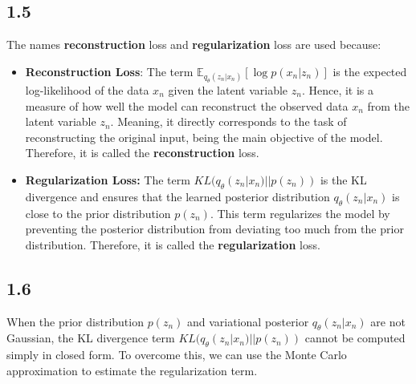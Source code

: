 \documentclass{article}
\begin{document}
\subsection*{1.5}

The names \textbf{reconstruction} loss and \textbf{regularization} loss are used because: 

\begin{itemize}
  \item \textbf{Reconstruction Loss}: The term $\mathbb{E}_{q_{\theta}(z_n|x_n)}[\log p(x_n|z_n)]$ is the expected log-likelihood
  of the data $x_n$ given the latent variable $z_n$. Hence, it is a measure of how well the model can reconstruct the
  observed data $x_n$ from the latent variable $z_n$. Meaning, it directly corresponds to the task of reconstructing the
  original input, being the main objective of the model. Therefore, it is called the \textbf{reconstruction} loss.

  \item\textbf{Regularization Loss:} The term $KL(q_{\theta}(z_n|x_n) || p(z_n))$ is the KL divergence and ensures
that the learned posterior distribution $q_{\theta}(z_n|x_n)$ is close to the prior distribution $p(z_n)$. This term
regularizes the model by preventing the posterior distribution from deviating too much from the prior distribution.
Therefore, it is called the \textbf{regularization} loss.
\end{itemize}

\newpage

\subsection*{1.6}

When the prior distribution $p(z_n)$ and variational posterior $q_{\theta}(z_n|x_n)$ are not Gaussian, the KL divergence
term $KL(q_{\theta}(z_n|x_n) || p(z_n))$ cannot be computed simply in closed form. To overcome this, we can use the
Monte Carlo approximation to estimate the regularization term. 
\end{document}

